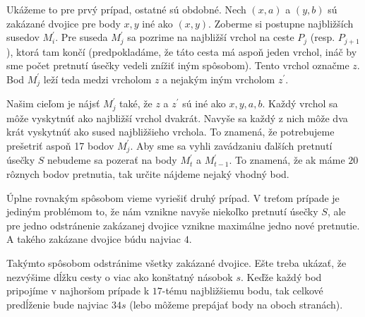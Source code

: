 \begin{dokaz}
Ukážeme to pre prvý prípad, ostatné sú obdobné. 
Nech $(x, a)$ a $(y, b)$ sú zakázané dvojice pre body $x, y$ iné ako $(x,y)$. 
Zoberme si postupne najbližších susedov $M_i^{'}$. Pre suseda $M^{'}_j$ sa pozrime na najbližší vrchol na
ceste $P_j$ (resp. $P_{j+1}$), ktorá tam končí (predpokladáme, že táto cesta má aspoň jeden vrchol, ináč by sme počet
pretnutí úsečky vedeli znížiť iným spôsobom). Tento vrchol označme $z$. Bod $M^{'}_j$ leží teda
medzi vrcholom $z$ a nejakým iným vrcholom $z^{'}$.  

Našim cieľom je nájsť $M_j^{'}$ také, že $z$ a $z^{'}$ sú iné ako $x, y, a, b$. Každý vrchol sa môže
vyskytnúť ako najbližší vrchol dvakrát. Navyše sa každý z nich môže dva krát vyskytnúť ako sused
najbližšieho vrchola. To znamená, že potrebujeme prešetriť aspoň 17 bodov $M_j^{'}$.
Aby sme sa vyhli zavádzaniu ďalších pretnutí úsečky $S$ nebudeme sa pozerať na body $M_t^{'}$ a
$M_{t-1}^{'}$. To znamená, že ak máme $20$ rôznych bodov pretnutia, tak určite nájdeme nejaký vhodný bod.

Úplne rovnakým spôsobom vieme vyriešiť druhý prípad. V treťom prípade je jediným problémom to, že
nám vznikne navyše niekoľko pretnutí úsečky $S$, ale pre jedno odstránenie zakázanej dvojice vznikne
maximálne jedno nové pretnutie. A takého zakázane dvojice búdu najviac $4$. 

Takýmto spôsobom odstránime všetky zakázané dvojice. Ešte treba ukázať, že nezvýšime dĺžku cesty
o viac ako konštatný násobok $s$. Keďže každý bod pripojíme v najhoršom prípade k $17$-tému
najbližšiemu bodu, tak celkové predĺženie bude najviac $34s$ (lebo môžeme prepájať body na oboch
stranách). 
\end{dokaz}
